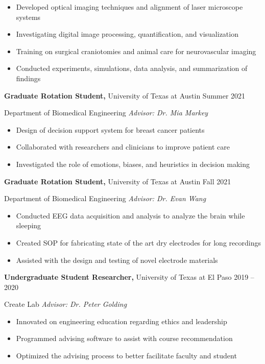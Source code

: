 \documentclass[11pt]{article}
\begin{document}
\begin{itemize}
\item
  Developed optical imaging techniques and alignment of laser microscope systems
\item
  Investigating digital image processing, quantification, and visualization
\item
  Training on surgical craniotomies and animal care for neurovascular imaging
\item
  Conducted experiments, simulations, data analysis, and summarization of findings
\end{itemize}

\textbf{Graduate Rotation Student,} University of Texas at Austin Summer 2021

Department of Biomedical Engineering \textbar{} \emph{Advisor: Dr. Mia Markey}

\begin{itemize}
\item
  Design of decision support system for breast cancer patients
\item
  Collaborated with researchers and clinicians to improve patient care
\item
  Investigated the role of emotions, biases, and heuristics in decision making
\end{itemize}

\textbf{Graduate Rotation Student,} University of Texas at Austin Fall 2021

Department of Biomedical Engineering \textbar{} \emph{Advisor: Dr. Evan Wang}

\begin{itemize}
\item
  Conducted EEG data acquisition and analysis to analyze the brain while sleeping
\item
  Created SOP for fabricating state of the art dry electrodes for long recordings
\item
  Assisted with the design and testing of novel electrode materials
\end{itemize}

\textbf{\hfill\break
}

\textbf{Undergraduate Student Researcher,} University of Texas at El Paso 2019 -- 2020

Create Lab \textbar{} \emph{Advisor: Dr. Peter Golding}

\begin{itemize}
\item
  Innovated on engineering education regarding ethics and leadership
\item
  Programmed advising software to assist with course recommendation
\item
  Optimized the advising process to better facilitate faculty and student
\end{itemize}
\end{document}
